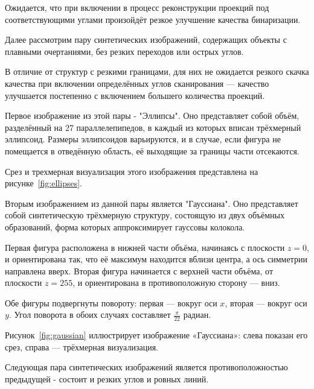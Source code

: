 Ожидается, что при включении в процесс реконструкции проекций под соответствующими углами произойдёт резкое улучшение качества бинаризации.


Далее рассмотрим пару синтетических изображений, содержащих объекты с плавными очертаниями, без резких переходов или острых углов.

В отличие от структур с резкими границами, для них не ожидается резкого скачка качества при включении определённых углов сканирования — качество улучшается постепенно с включением большего количества проекций.

Первое изображение из этой пары - "Эллипсы". Оно представляет собой объём, разделённый на 27 параллелепипедов, в каждый из которых вписан трёхмерный эллипсоид. Размеры эллипсоидов варьируются, и в случае, если фигура не помещается в отведённую область, её выходящие за границы части отсекаются.

Срез и трехмерная визуализация этого изображения представлена на рисунке~\ref{fig:ellipses}.


Вторым изображением из данной пары является "Гауссиана". Оно представляет собой синтетическую трёхмерную структуру, состоящую из двух объёмных образований, форма которых аппроксимирует гауссовы колокола.

Первая фигура расположена в нижней части объёма, начинаясь с плоскости \(z = 0\), и ориентирована так, что её максимум находится вблизи центра, а ось симметрии направлена вверх. Вторая фигура начинается с верхней части объёма, от плоскости \(z = 255\), и ориентирована в противоположную сторону — вниз.

Обе фигуры подвергнуты повороту: первая — вокруг оси \(x\), вторая — вокруг оси \(y\). Угол поворота в обоих случаях составляет \(\frac{\pi}{22}\) радиан.

Рисунок~\ref{fig:gaussian} иллюстрирует изображение «Гауссиана»: слева показан его срез, справа — трёхмерная визуализация.


Следующая пара синтетических изображений является противоположностью предыдущей - состоит и резких углов и ровных линий.

